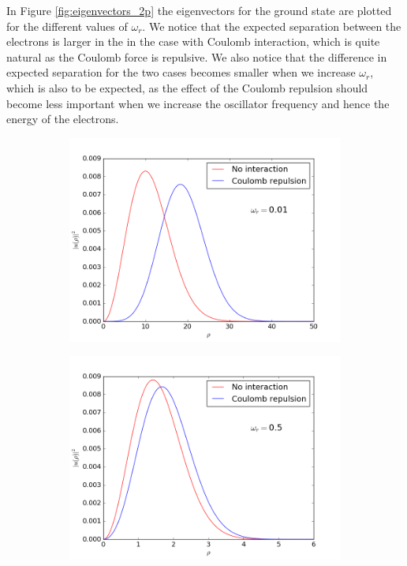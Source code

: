 \documentclass[12pt, a4paper]{article}
\begin{document}
In Figure \ref{fig:eigenvectors_2p} the eigenvectors for the ground state are plotted for the different 
values of $\omega_r$. We notice that the expected separation between the electrons is larger in the in 
the case with Coulomb interaction, which is quite natural as the Coulomb force is repulsive. We also 
notice that the difference in expected separation for the two cases becomes smaller when we increase 
$\omega_r$, which is also to be expected, as the effect of the Coulomb repulsion should become less 
important when we increase the oscillator frequency and hence the energy of the electrons. 

\begin{figure}[ht!]
  \centering
  \begin{subfigure}[b]{0.495\textwidth}
		\includegraphics[width=\textwidth]{../Programs/Output/TwoParticle_Eigenvectors_omega001.png}
  \end{subfigure}
  \begin{subfigure}[b]{0.495\textwidth}
		\includegraphics[width=\textwidth]{../Programs/Output/TwoParticle_Eigenvectors_omega05.png}

\end{subfigure}
\end{figure}
\end{document}
